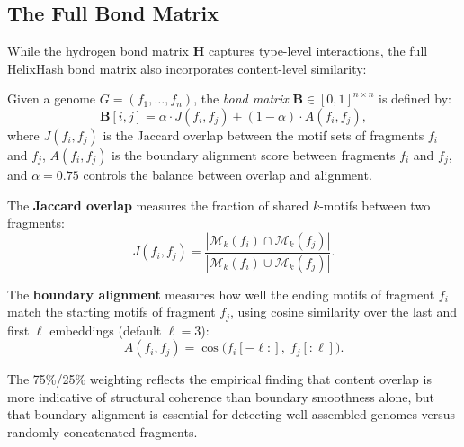 \subsection{The Full Bond Matrix}

While the hydrogen bond matrix $\mathbf{H}$ captures type-level interactions, the full HelixHash bond matrix also incorporates content-level similarity:

\begin{definition}
\label{def:bond-matrix}
Given a genome $G = (f_1, \ldots, f_n)$, the \emph{bond matrix} $\mathbf{B} \in [0, 1]^{n \times n}$ is defined by:
\begin{equation}
\mathbf{B}[i, j] = \alpha \cdot J(f_i, f_j) + (1 - \alpha) \cdot A(f_i, f_j),
\label{eq:bond-matrix}
\end{equation}
where $J(f_i, f_j)$ is the Jaccard overlap between the motif sets of fragments $f_i$ and $f_j$, $A(f_i, f_j)$ is the boundary alignment score between fragments $f_i$ and $f_j$, and $\alpha = 0.75$ controls the balance between overlap and alignment.
\end{definition}

The \textbf{Jaccard overlap} measures the fraction of shared $k$-motifs between two fragments:
\begin{equation}
J(f_i, f_j) = \frac{|\mathcal{M}_k(f_i) \cap \mathcal{M}_k(f_j)|}{|\mathcal{M}_k(f_i) \cup \mathcal{M}_k(f_j)|}.
\end{equation}

The \textbf{boundary alignment} measures how well the ending motifs of fragment $f_i$ match the starting motifs of fragment $f_j$, using cosine similarity over the last and first $\ell$ embeddings (default $\ell = 3$):
\begin{equation}
A(f_i, f_j) = \cos\bigl(f_i[{-\ell}{:}], \; f_j[{:}{\ell}]\bigr).
\end{equation}

The 75\%/25\% weighting reflects the empirical finding that content overlap is more indicative of structural coherence than boundary smoothness alone, but that boundary alignment is essential for detecting well-assembled genomes versus randomly concatenated fragments.

